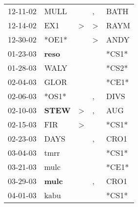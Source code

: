 \begin{supertabular}{p{0.07\textwidth}p{0.06\textwidth}p{0.02\textwidth}p{0.02\textwidth}p{0.06\textwidth}}
          12-11-02\textsuperscript{} &           MULL\textsuperscript{} &                  &                , &           BATH\textsuperscript{} \\
          12-14-02\textsuperscript{} &            EX1\textsuperscript{} &     \textgreater &     \textgreater &           RAYM\textsuperscript{} \\
          12-30-02\textsuperscript{} &                            *OE1* &                  &     \textgreater &           ANDY\textsuperscript{} \\
          01-23-03\textsuperscript{} &  \textbf{reso\textsuperscript{}} &                  &                  &                            *CS1* \\
          01-28-03\textsuperscript{} &           WALY\textsuperscript{} &                  &                  &                            *CS2* \\
          02-04-03\textsuperscript{} &           GLOR\textsuperscript{} &                  &                  &                            *CE1* \\
          02-06-03\textsuperscript{} &                            *OS1* &                  &                , &           DIVS\textsuperscript{} \\
          02-10-03\textsuperscript{} &  \textbf{STEW\textsuperscript{}} &     \textgreater &                , &            AUG\textsuperscript{} \\
          02-15-03\textsuperscript{} &            FIR\textsuperscript{} &     \textgreater &                  &                            *CS1* \\
          02-23-03\textsuperscript{} &           DAYS\textsuperscript{} &                  &                , &           CRO1\textsuperscript{} \\
          03-04-03\textsuperscript{} &           tmrr\textsuperscript{} &                  &                  &                            *CS1* \\
          03-21-03\textsuperscript{} &           mulc\textsuperscript{} &                  &                  &                            *CE1* \\
          03-29-03\textsuperscript{} &  \textbf{mulc\textsuperscript{}} &                  &                , &           CRO1\textsuperscript{} \\
          04-01-03\textsuperscript{} &           kabu\textsuperscript{} &                  &                  &                            *CS1* \\

\end{supertabular}
